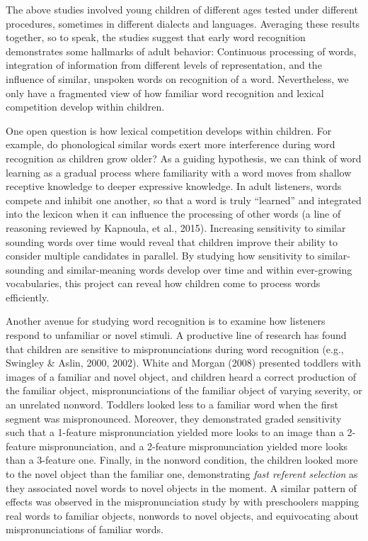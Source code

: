 \documentclass[]{book}
\theoremstyle{definition}
\theoremstyle{definition}
\theoremstyle{remark}
\begin{document}
The above studies involved young children of different ages tested under
different procedures, sometimes in different dialects and languages.
Averaging these results together, so to speak, the studies suggest that
early word recognition demonstrates some hallmarks of adult behavior:
Continuous processing of words, integration of information from
different levels of representation, and the influence of similar,
unspoken words on recognition of a word. Nevertheless, we only have a
fragmented view of how familiar word recognition and lexical competition
develop within children.

One open question is how lexical competition develops within children.
For example, do phonological similar words exert more interference
during word recognition as children grow older? As a guiding hypothesis,
we can think of word learning as a gradual process where familiarity
with a word moves from shallow receptive knowledge to deeper expressive
knowledge. In adult listeners, words compete and inhibit one another, so
that a word is truly ``learned'' and integrated into the lexicon when it
can influence the processing of other words (a line of reasoning
reviewed by Kapnoula, et al., 2015). Increasing sensitivity to similar
sounding words over time would reveal that children improve their
ability to consider multiple candidates in parallel. By studying how
sensitivity to similar-sounding and similar-meaning words develop over
time and within ever-growing vocabularies, this project can reveal how
children come to process words efficiently.

Another avenue for studying word recognition is to examine how listeners
respond to unfamiliar or novel stimuli. A productive line of research
has found that children are sensitive to mispronunciations during word
recognition (e.g., Swingley \& Aslin, 2000, 2002). White and Morgan
(2008) presented toddlers with images of a familiar and novel object,
and children heard a correct production of the familiar object,
mispronunciations of the familiar object of varying severity, or an
unrelated nonword. Toddlers looked less to a familiar word when the
first segment was mispronounced. Moreover, they demonstrated graded
sensitivity such that a 1-feature mispronunciation yielded more looks to
an image than a 2-feature mispronunciation, and a 2-feature
mispronunciation yielded more looks than a 3-feature one. Finally, in
the nonword condition, the children looked more to the novel object than
the familiar one, demonstrating \emph{fast referent selection} as they
associated novel words to novel objects in the moment. A similar pattern
of effects was observed in the mispronunciation study by \citet{MPPaper}
with preschoolers mapping real words to familiar objects, nonwords to
novel objects, and equivocating about mispronunciations of familiar
words.
\end{document}

